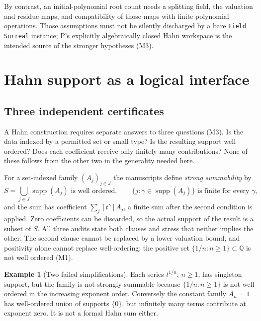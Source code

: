 \documentclass[11pt,letterpaper]{article}
\numberwithin{equation}{section}
\theoremstyle{definition}
\newtheorem{example}[theorem]{Example}
\theoremstyle{remark}
\newcommand{\Q}{\mathbb Q}
\newcommand{\supp}{\operatorname{supp}}
\begin{document}
By contrast, an initial-polynomial root count needs a splitting field, the
valuation and residue maps, and compatibility of those maps with finite
polynomial operations. Those assumptions must not be silently discharged by a
bare \texttt{Field Surreal} instance; P's explicitly algebraically closed Hahn
workspace is the intended source of the stronger hypotheses (M3).

\section{Hahn support as a logical interface}
\label{found:sec:support}

\subsection{Three independent certificates}
\label{found:sub:certificates}
A Hahn construction requires separate answers to three questions (M3). Is the
data indexed by a permitted set or small type? Is the resulting support well
ordered? Does each coefficient receive only finitely many contributions? None of
these follows from the other two in the generality needed here.

For a set-indexed family $(A_j)_{j\in J}$ the manuscripts define \emph{strong
summability} by
\begin{equation}\label{found:eq:summability}
 S=\bigcup_{j\in J}\supp(A_j)\text{ is well ordered},\qquad
 \{j:\gamma\in\supp(A_j)\}\text{ is finite for every }\gamma,
\end{equation}
and the sum has coefficient $\sum_j[t^\gamma]A_j$, a finite sum after the second
condition is applied. Zero coefficients can be discarded, so the actual support
of the result is a subset of $S$. All three audits state both clauses and stress
that neither implies the other. The second clause cannot be replaced by a lower
valuation bound, and positivity alone cannot replace well-ordering: the positive
set $\{1/n:n\ge1\}\subset\Q$ is not well ordered (M1).

\begin{example}[Two failed simplifications]\label{found:ex:failed}
Each series $t^{1/n}$, $n\ge1$, has singleton support, but the family is not
strongly summable because $\{1/n:n\ge1\}$ is not well ordered in the increasing
exponent order. Conversely the constant family $A_n=1$ has well-ordered union of
supports $\{0\}$, but infinitely many terms contribute at exponent zero. It is
not a formal Hahn sum either.
\end{example}
\end{document}
